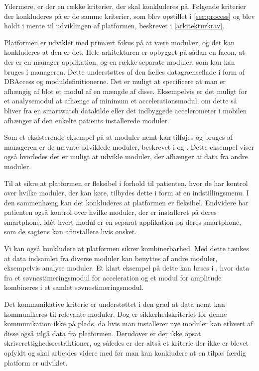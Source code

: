 Ydermere, er der en række kriterier, der skal konkluderes på.
Følgende kriterier der konkluderes på er de samme kriterier, som blev opstillet i \cref{sec:process} og blev holdt i mente til udviklingen af platformen, beskrevet i \cref{arkitekturkrav}.
\begin{description}[style=nextline]
	\item[Modulær]
	Platformen er udviklet med primært fokus på at være modulær, og det kan konkluderes at den er det.
	Hele arkitekturen er opbygget på sådan en facon, at der er en manager applikation, og en række separate moduler, som kan kan bruges i manageren.
	Dette understøttes af den fælles datagrænseflade i form af DBAccess og moduldefinitionerne.  
	Det er muligt at specificere at man er afhængig af blot et modul af en mængde af disse.
	Eksempelvis er det muligt for et analysemodul at afhænge af minimum et accelerationsmodul, om dette så bliver fra en smartwatch datakilde eller det indbyggede accelerometer i mobilen afhænger af den enkelte patients installerede moduler.
	
	Som et eksisterende eksempel på at moduler nemt kan tilføjes og bruges af manageren er de nævnte udviklede moduler, beskrevet i \citet{misc:soevnrapp} og \citet{misc:surveyrapp}.
	Dette eksempel viser også hvorledes det er muligt at udvikle moduler, der afhænger af data fra andre moduler.
	
	\item[Fleksibilitet]
	Til at sikre at platformen er fleksibel i forhold til patienten, hvor de har kontrol over hvilke moduler, der kan køre, tilbydes dette i form af en indstillingsmenu.
	I den sammenhæng kan det konkluderes at platformen er fleksibel.
	Endvidere har patienten også kontrol over hvilke moduler, der er installeret på deres smartphone, idét hvert modul er en separat applikation på deres smartphone, som de sagtens kan afinstallere hvis ønsket.
	
	\item[Kombinerbar]
	Vi kan også konkludere at platformen sikrer kombinerbarhed.
	Med dette tænkes at data indsamlet fra diverse moduler kan benyttes af andre moduler, eksempelvis analyse moduler.
	Et klart eksempel på dette kan læses i \citet{misc:soevnrapp}, hvor data fra et søvnestimeringsmodul for acceleration og et modul for amplitude kombineres i et samlet søvnestimeringsmodul.
	
	\item[Kommunikativ]
	Det kommunikative kriterie er understøttet i den grad at data nemt kan kommunikeres til relevante moduler.
	Dog er sikkerhedskriteriet for denne kommunikation ikke på plads, da hvis man installerer nye moduler kan ethvert af disse også tilgå data fra platformen.
	Derudover er der ikke opsat skriverettighedsrestriktioner, og således er der altså et kriterie der ikke er blevet opfyldt og skal arbejdes videre med før man kan konkludere at en tilpas færdig platform er udviklet.
\end{description}


